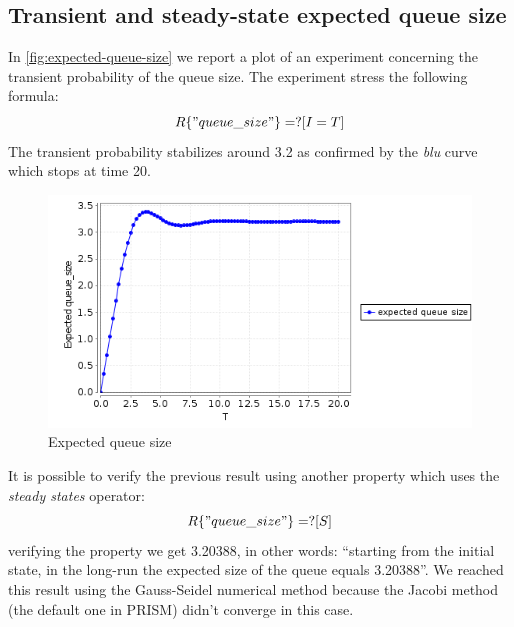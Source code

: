 \subsection{Transient and steady-state expected queue size}

In \autoref{fig:expected-queue-size} we report a plot of an experiment
concerning the transient probability of the queue size. The experiment
stress the following formula:
\begin{displaymath}
  R\{"queue\_size"\}=? [ I=T ]
\end{displaymath}
The transient probability stabilizes around 3.2 as confirmed by the
\emph{blu} curve which stops at time 20.
\begin{figure}[htb]
  \centering
  \includegraphics[width=13cm]{quantitative-project/expected-queue-size.png}
  \caption{Expected queue size}
  \label{fig:expected-queue-size}
\end{figure}
It is possible to verify the previous result using another property
which uses the \emph{steady states} operator:
\begin{displaymath}
  R\{"queue\_size"\}=? [ S ]
\end{displaymath}
verifying the property we get 3.20388, in other words: ``starting from
the initial state, in the long-run the expected size of the queue
equals 3.20388''. We reached this result using the Gauss-Seidel
numerical method because the Jacobi method (the default one in PRISM)
didn't converge in this case.

